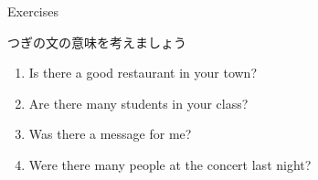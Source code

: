 \documentclass[aspectratio=169]{beamer}
\begin{document}
\begin{frame}[plain]{Exercises}

つぎの文の意味を考えましょう
\begin{enumerate}
 \item Is there a good restaurant in your town?
 \item Are there many students in your class?
 \item Was there a message for me?
 \item Were there many people at the concert last night?
\end{enumerate}

 

\end{frame}
\end{document}
